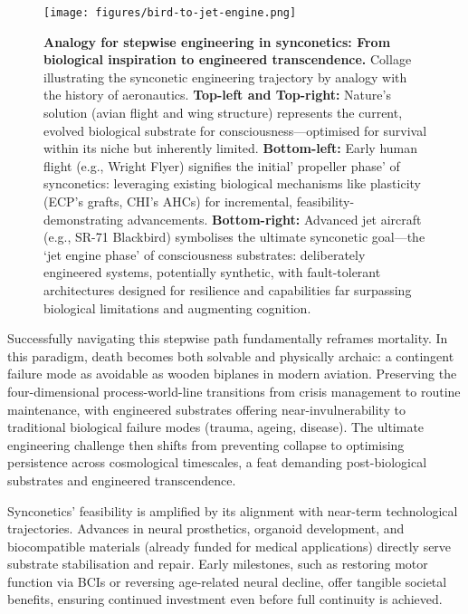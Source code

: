 \documentclass[10pt]{article}
\begin{document}
\begin{sloppypar}
  \begin{figure}[ht!]
    \centering
    \texttt{[image: figures/bird-to-jet-engine.png]}
    \caption[Analogy for stepwise engineering in synconetics]{\textbf{Analogy for stepwise engineering in synconetics: From biological inspiration to engineered transcendence.} Collage illustrating the synconetic engineering trajectory by analogy with the history of aeronautics. \textbf{Top-left and Top-right:} Nature’s solution (avian flight and wing structure) represents the current, evolved biological substrate for consciousness—optimised for survival within its niche but inherently limited. \textbf{Bottom-left:} Early human flight (e.g., Wright Flyer) signifies the initial’ propeller phase’ of synconetics: leveraging existing biological mechanisms like plasticity (ECP’s grafts, CHI’s AHCs) for incremental, feasibility-demonstrating advancements. \textbf{Bottom-right:} Advanced jet aircraft (e.g., SR-71 Blackbird) symbolises the ultimate synconetic goal—the ‘jet engine phase’ of consciousness substrates: deliberately engineered systems, potentially synthetic, with fault-tolerant architectures designed for resilience and capabilities far surpassing biological limitations and augmenting cognition.}
    \label{fig:engineering-progression}
  \end{figure}

  Successfully navigating this stepwise path fundamentally reframes mortality. In this paradigm, death becomes both solvable and physically archaic: a contingent failure mode as avoidable as wooden biplanes in modern aviation. Preserving the four-dimensional process-world-line transitions from crisis management to routine maintenance, with engineered substrates offering near-invulnerability to traditional biological failure modes (trauma, ageing, disease). The ultimate engineering challenge then shifts from preventing collapse to optimising persistence across cosmological timescales, a feat demanding post-biological substrates and engineered transcendence.

  Synconetics’ feasibility is amplified by its alignment with near-term technological trajectories. Advances in neural prosthetics, organoid development, and biocompatible materials (already funded for medical applications) directly serve substrate stabilisation and repair. Early milestones, such as restoring motor function via BCIs or reversing age-related neural decline, offer tangible societal benefits, ensuring continued investment even before full continuity is achieved.


\end{sloppypar}
\end{document}

